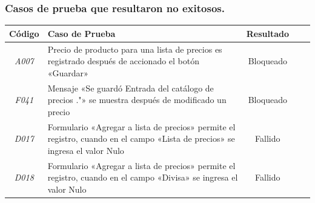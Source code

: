 \documentclass{beamer}
\begin{document}
\begin{frame}
\frametitle{Casos de prueba que resultaron no exitosos.}
\begin{table}
\tiny
\centering
\begin{tabular}{|c|p{5.4cm}|c|c|c|}
\hline
\footnotesize{\textbf{Código}} & \footnotesize{\textbf{Caso de Prueba}} &
\footnotesize{\textbf{Resultado}} \\
\hline
\footnotesize{\emph{A007}} &
\footnotesize{Precio de producto para una lista de precios es registrado después
de accionado el botón «Guardar»} &
\footnotesize{Bloqueado} 
\\
\footnotesize{\emph{F041}} &
\footnotesize{Mensaje «Se guardó Entrada del catálogo de precios ."» se muestra
después de modificado un precio} &
\footnotesize{Bloqueado}
\\
\footnotesize{\emph{D017}} &
\footnotesize{Formulario «Agregar a lista de precios» permite el registro,
cuando en el campo «Lista de precios» se ingresa el valor Nulo} &
\footnotesize{Fallido} 
\\
\footnotesize{\emph{D018}} &
\footnotesize{Formulario «Agregar a lista de precios» permite el registro,
cuando en el campo «Divisa» se ingresa el valor Nulo} &
\footnotesize{Fallido}
\\
\hline
\end{tabular}
\end{table}

\end{frame}
\end{document}
